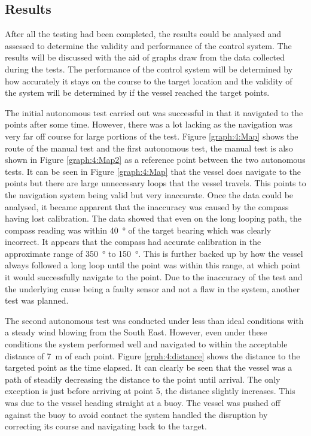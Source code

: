 \subsection{Results}
After all the testing had been completed, the results could be analysed and assessed to determine the validity and performance of the control system. The results will be discussed with the aid of graphs draw from the data collected during the tests. The performance of the control system will be determined by how accurately it stays on the course to the target location and the validity of the system will be determined by if the vessel reached the target points. \par
The initial autonomous test carried out was successful in that it navigated to the points after some time. However, there was a lot lacking as the navigation was very far off course for large portions of the test. Figure \ref{graph:4:Map} shows the route of the manual test and the first autonomous test, the manual test is also shown in Figure \ref{graph:4:Map2} as a reference point between the two autonomous tests. It can be seen in Figure \ref{graph:4:Map} that the vessel does navigate to the points but there are large unnecessary loops that the vessel travels. This points to the navigation system being valid but very inaccurate. Once the data could be analysed, it became apparent that the inaccuracy was caused by the compass having lost calibration. The data showed that even on the long looping path, the compass reading was within \SI{40}{\degree} of the target bearing which was clearly incorrect. It appears that the compass had accurate calibration in the approximate range of \SI{350}{\degree} to \SI{150}{\degree}. This is further backed up by how the vessel always followed a long loop until the point was within this range, at which point it would successfully navigate to the point. Due to the inaccuracy of the test and the underlying cause being a faulty sensor and not a flaw in the system, another test was planned.\par
\vspace{0.6cm}
The second autonomous test was conducted under less than ideal conditions with a steady wind blowing from the South East. However, even under these conditions the system performed well and navigated to within the acceptable distance of \SI{7}{\metre} of each point. Figure \ref{grph:4:distance} shows the distance to the targeted point as the time elapsed. It can clearly be seen that the vessel was a path of steadily decreasing the distance to the point until arrival. The only exception is just before arriving at point 5, the distance slightly increases. This was due to the vessel heading straight at a buoy. The vessel was pushed off against the buoy to avoid contact the system handled the disruption by correcting its course and navigating back to the target.\par 
